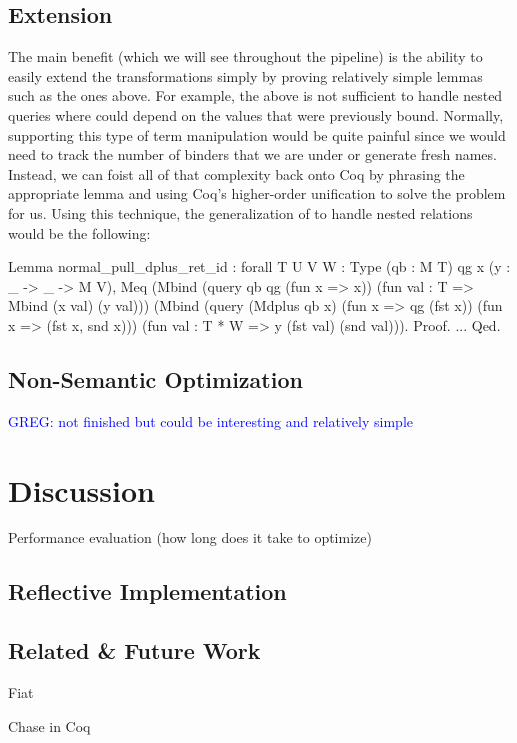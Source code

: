 \documentclass[preprint]{sigplanconf}
\newcommand{\greg}[1]{\textcolor{blue}{GREG: #1}}
\begin{document}
\subsection{Extension}
The main benefit (which we will see throughout the pipeline) is the ability to easily extend the transformations simply by proving relatively simple lemmas such as the ones above.
For example, the above  is not sufficient to handle nested queries where  could depend on the values that were previously bound.
Normally, supporting this type of term manipulation would be quite painful since we would need to track the number of binders that we are under or generate fresh names.
Instead, we can foist all of that complexity back onto Coq by phrasing the appropriate lemma and using Coq's higher-order unification to solve the problem for us.
Using this technique, the generalization of  to handle nested relations would be the following:
\begin{coq}
Lemma normal_pull_dplus_ret_id
: forall {T U V W : Type} (qb : M T) qg x (y : _ -> _ -> M V),
  Meq (Mbind (query qb qg (fun x => x))
             (fun val : T => Mbind (x val) (y val)))
      (Mbind (query (Mdplus qb x) (fun x => qg (fst x)) (fun x => (fst x, snd x)))
             (fun val : T * W => y (fst val) (snd val))).
Proof. ... Qed.
\end{coq}


\subsection{Non-Semantic Optimization}
\greg{not finished but could be interesting and relatively simple}

\section{Discussion}

Performance evaluation (how long does it take to optimize)

\subsection{Reflective Implementation}

\subsection{Related \& Future Work}
Fiat~\cite{deleware2015fiat}

Chase in Coq~\cite{}
\end{document}
